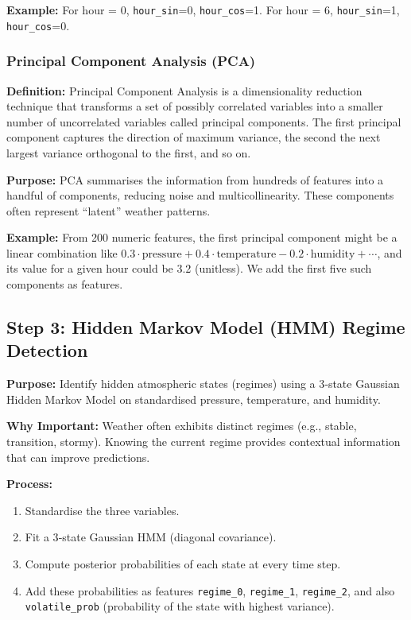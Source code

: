 \documentclass[12pt]{article}
\begin{document}
	\textbf{Example:} For hour = 0, \texttt{hour\_sin}=0, \texttt{hour\_cos}=1. For hour = 6, \texttt{hour\_sin}=1, \texttt{hour\_cos}=0.
	
	\subsubsection{Principal Component Analysis (PCA)}
	\textbf{Definition:} Principal Component Analysis is a dimensionality reduction technique that transforms a set of possibly correlated variables into a smaller number of uncorrelated variables called principal components. The first principal component captures the direction of maximum variance, the second the next largest variance orthogonal to the first, and so on.
	
	\textbf{Purpose:} PCA summarises the information from hundreds of features into a handful of components, reducing noise and multicollinearity. These components often represent “latent” weather patterns.
	
	\textbf{Example:} From 200 numeric features, the first principal component might be a linear combination like $0.3\cdot\text{pressure} + 0.4\cdot\text{temperature} - 0.2\cdot\text{humidity} + \cdots$, and its value for a given hour could be 3.2 (unitless). We add the first five such components as features.
	
	\subsection{Step 3: Hidden Markov Model (HMM) Regime Detection}
	\textbf{Purpose:} Identify hidden atmospheric states (regimes) using a 3‑state Gaussian Hidden Markov Model on standardised pressure, temperature, and humidity.
	
	\textbf{Why Important:} Weather often exhibits distinct regimes (e.g., stable, transition, stormy). Knowing the current regime provides contextual information that can improve predictions.
	
	\textbf{Process:}
	\begin{enumerate}
		\item Standardise the three variables.
		\item Fit a 3‑state Gaussian HMM (diagonal covariance).
		\item Compute posterior probabilities of each state at every time step.
		\item Add these probabilities as features \texttt{regime\_0}, \texttt{regime\_1}, \texttt{regime\_2}, and also \texttt{volatile\_prob} (probability of the state with highest variance).
	\end{enumerate}
	
\end{document}

